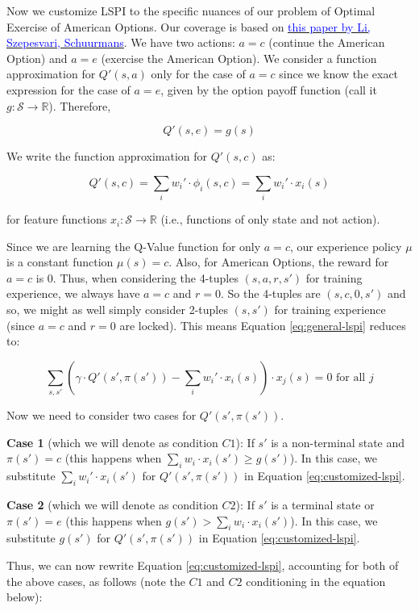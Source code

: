 \documentclass[12pt]{amsart}
\begin{document}
Now we customize LSPI to the specific nuances of our problem of Optimal Exercise of American Options. Our coverage is based on \href{http://proceedings.mlr.press/v5/li09d/li09d.pdf}{\underline{\textcolor{blue}{this paper by Li, Szepesvari, Schuurmans}}}. We have two actions: $a=c$ (continue the American Option) and $a=e$ (exercise the American Option). We consider a function approximation for $Q'(s,a)$ only for the case of $a=c$ since we know the exact expression for the case of $a=e$, given by the option payoff function (call it $g: \mathcal{S} \rightarrow \mathbb{R}$). Therefore,

$$Q'(s,e) = g(s)$$

We write the function approximation for $Q'(s,c)$ as:

$$Q'(s,c) = \sum_i w_i' \cdot \phi_i(s, c) = \sum_i w_i' \cdot x_i(s)$$

for feature functions $x_i: \mathcal{S} \rightarrow \mathbb{R}$ (i.e., functions of only state and not action).

Since we are learning the Q-Value function for only $a=c$, our experience policy $\mu$ is a constant function $\mu(s) = c$. Also, for American Options, the reward for $a=c$ is 0. Thus, when considering the 4-tuples $(s,a,r,s')$ for training experience, we always have $a=c$ and $r=0$. So the 4-tuples are $(s,c,0,s')$ and so, we might as well simply consider 2-tuples $(s,s')$ for training experience (since $a=c$ and $r=0$ are locked). This means Equation \eqref{eq:general-lspi} reduces to:

\begin{equation}
\sum_{s,s'} (\gamma \cdot Q'(s',\pi(s')) - \sum_i w_i' \cdot x_i(s)) \cdot x_j(s) = 0 \text{ for all } j
\label{eq:customized-lspi}
\end{equation}

Now we need to consider two cases for $Q'(s',\pi(s'))$.

{\bf Case 1} (which we will denote as condition $C1$): If $s'$ is a non-terminal state and $\pi(s') = c$ (this happens when $\sum_i w_i \cdot x_i(s') \geq g(s')$). In this case, we substitute $\sum_i w_i' \cdot x_i(s')$ for $Q'(s',\pi(s'))$ in Equation \eqref{eq:customized-lspi}.

{\bf Case 2} (which we will denote as condition $C2$): If $s'$ is a terminal state or $\pi(s') = e$ (this happens when $g(s') > \sum_i w_i \cdot x_i(s')$). In this case, we substitute $g(s')$ for $Q'(s',\pi(s'))$ in Equation \eqref{eq:customized-lspi}.

Thus, we can now rewrite Equation \eqref{eq:customized-lspi}, accounting for both of the above cases, as follows (note the $C1$ and $C2$ conditioning in the equation below):
\end{document}
